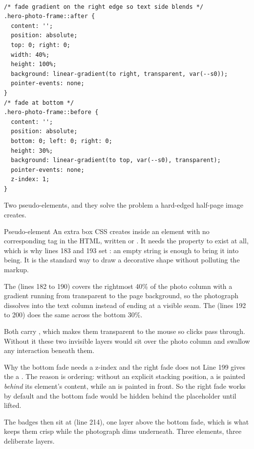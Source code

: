 \begin{lstlisting}[firstnumber=180,caption={\file{css/site.css}, lines 180--200}]

/* fade gradient on the right edge so text side blends */
.hero-photo-frame::after {
  content: '';
  position: absolute;
  top: 0; right: 0;
  width: 40%;
  height: 100%;
  background: linear-gradient(to right, transparent, var(--s0));
  pointer-events: none;
}
/* fade at bottom */
.hero-photo-frame::before {
  content: '';
  position: absolute;
  bottom: 0; left: 0; right: 0;
  height: 30%;
  background: linear-gradient(to top, var(--s0), transparent);
  pointer-events: none;
  z-index: 1;
}
\end{lstlisting}

Two pseudo-elements, and they solve the problem a hard-edged half-page image
creates.

\begin{jargon}{Pseudo-element}
An extra box CSS creates inside an element with no corresponding tag in the HTML,
written  or . It needs the  property to
exist at all, which is why lines 183 and 193 set : an empty
string is enough to bring it into being. It is the standard way to draw a
decorative shape without polluting the markup.
\end{jargon}

The  (lines 182 to 190) covers the rightmost 40\% of the photo column
with a gradient running from transparent to the page background, so the photograph
dissolves into the text column instead of ending at a visible seam. The
 (lines 192 to 200) does the same across the bottom 30\%.

Both carry , which makes them transparent to the mouse
so clicks pass through. Without it these two invisible layers would sit over the
photo column and swallow any interaction beneath them.

\begin{keyidea}{Why the bottom fade needs a z-index and the right fade does not}
Line 199 gives the  a . The reason is ordering:
without an explicit stacking position, a  is painted \emph{behind}
its element's content, while an  is painted in front. So the right
fade works by default and the bottom fade would be hidden behind the placeholder
until lifted.

The badges then sit at  (line 214), one layer above the bottom
fade, which is what keeps them crisp while the photograph dims underneath. Three
elements, three deliberate layers.
\end{keyidea}

